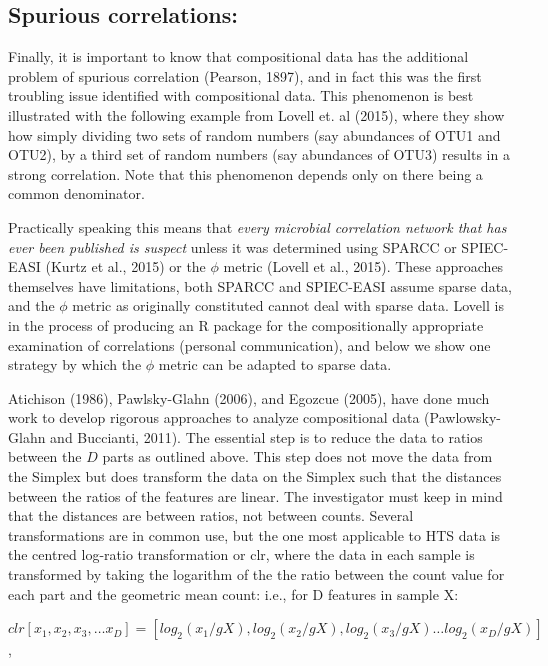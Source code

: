\documentclass[twocolumn]{article}
\begin{document}
\subsection{Spurious correlations:}\label{spurious-correlations}

Finally, it is important to know that compositional data has the
additional problem of spurious correlation (Pearson, 1897), and in fact
this was the first troubling issue identified with compositional data.
This phenomenon is best illustrated with the following example from
Lovell et. al (2015), where they show how simply dividing two sets of
random numbers (say abundances of OTU1 and OTU2), by a third set of
random numbers (say abundances of OTU3) results in a strong correlation.
Note that this phenomenon depends only on there being a common
denominator.

Practically speaking this means that
\emph{every microbial correlation network that has ever been published is suspect}
unless it was determined using SPARCC \cite{Friedman:2012} or SPIEC-EASI
(Kurtz et al., 2015) or the \(\phi\) metric (Lovell et al., 2015). These
approaches themselves have limitations, both SPARCC and SPIEC-EASI
assume sparse data, and the \(\phi\) metric as originally constituted
cannot deal with sparse data. Lovell is in the process of producing an R
package for the compositionally appropriate examination of correlations
(personal communication), and below we show one strategy by which the
\(\phi\) metric can be adapted to sparse data.

Atichison (1986), Pawlsky-Glahn (2006), and Egozcue (2005), have done
much work to develop rigorous approaches to analyze compositional data
(Pawlowsky-Glahn and Buccianti, 2011). The essential step is to reduce
the data to ratios between the \(D\) parts as outlined above. This step
does not move the data from the Simplex but does transform the data on
the Simplex such that the distances between the ratios of the features
are linear. The investigator must keep in mind that the distances are
between ratios, not between counts. Several transformations are in
common use, but the one most applicable to HTS data is the centred
log-ratio transformation or clr, where the data in each sample is
transformed by taking the logarithm of the the ratio between the count
value for each part and the geometric mean count: i.e., for D features
in sample X:

\(clr [x_1, x_2, x_3, \ldots x_D] = [log_2(x_1/gX), log_2(x_2/gX), log_2(x_3/gX) \ldots log_2(x_D/gX)]\),
\end{document}
